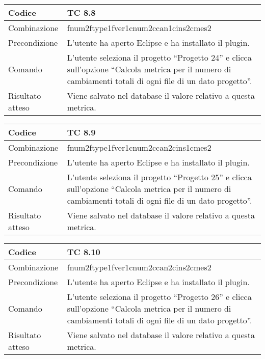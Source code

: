 \begin{table}[ht]
\begin{tabular}{|p{3cm}|p{9cm}|}
\hline
\cellcolor{lightgray}Codice				& TC 8.8								\\
\hline
\cellcolor{lightgray}Combinazione		& fnum2ftype1fver1cnum2ccan1cins2cmes2									\\
\hline
\cellcolor{lightgray}Precondizione		& L'utente ha aperto Eclipse e ha installato il plugin.		\\
\hline
\cellcolor{lightgray}Comando			& L'utente seleziona il progetto ``Progetto 24''  e clicca sull'opzione ``Calcola metrica per il numero di cambiamenti totali di ogni file di un dato progetto''.	\\
\hline
\cellcolor{lightgray}Risultato atteso	& Viene salvato nel database il valore relativo a questa metrica.\\
\hline
\end{tabular}
\end{table}

\begin{table}[ht]
\begin{tabular}{|p{3cm}|p{9cm}|}
\hline
\cellcolor{lightgray}Codice				& TC 8.9								\\
\hline
\cellcolor{lightgray}Combinazione		& fnum2ftype1fver1cnum2ccan2cins1cmes2									\\
\hline
\cellcolor{lightgray}Precondizione		& L'utente ha aperto Eclipse e ha installato il plugin.		\\
\hline
\cellcolor{lightgray}Comando			& L'utente seleziona il progetto ``Progetto 25''  e clicca sull'opzione ``Calcola metrica per il numero di cambiamenti totali di ogni file di un dato progetto''.	\\
\hline
\cellcolor{lightgray}Risultato atteso	& Viene salvato nel database il valore relativo a questa metrica.\\
\hline
\end{tabular}
\end{table}

\clearpage

\begin{table}[ht]
\begin{tabular}{|p{3cm}|p{9cm}|}
\hline
\cellcolor{lightgray}Codice				& TC 8.10								\\
\hline
\cellcolor{lightgray}Combinazione		& fnum2ftype1fver1cnum2ccan2cins2cmes2									\\
\hline
\cellcolor{lightgray}Precondizione		& L'utente ha aperto Eclipse e ha installato il plugin.		\\
\hline
\cellcolor{lightgray}Comando			& L'utente seleziona il progetto ``Progetto 26''  e clicca sull'opzione ``Calcola metrica per il numero di cambiamenti totali di ogni file di un dato progetto''.	\\
\hline
\cellcolor{lightgray}Risultato atteso	& Viene salvato nel database il valore relativo a questa metrica.\\
\hline
\end{tabular}
\end{table}

